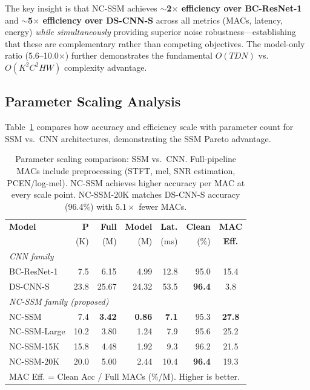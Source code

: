 \documentclass[journal]{IEEEtran}
\begin{document}
\smallskip
The key insight is that NC-SSM achieves \textbf{$\sim$2$\times$ efficiency over BC-ResNet-1} and \textbf{$\sim$5$\times$ efficiency over DS-CNN-S} across all metrics (MACs, latency, energy) \emph{while simultaneously} providing superior noise robustness---establishing that these are complementary rather than competing objectives.
The model-only ratio (5.6--10.0$\times$) further demonstrates the fundamental $O(TDN)$ vs.\ $O(K^2C^2HW)$ complexity advantage.

\subsection{Parameter Scaling Analysis}

Table~\ref{tab:scaling} compares how accuracy and efficiency scale with parameter count for SSM vs.\ CNN architectures, demonstrating the SSM Pareto advantage.

\begin{table}[t]
\centering
\caption{Parameter scaling comparison: SSM vs.\ CNN. Full-pipeline MACs include preprocessing (STFT, mel, SNR estimation, PCEN/log-mel). NC-SSM achieves higher accuracy per MAC at every scale point. NC-SSM-20K matches DS-CNN-S accuracy (96.4\%) with $5.1\times$ fewer MACs.}
\label{tab:scaling}
\small
\setlength{\tabcolsep}{2.8pt}
\begin{tabular}{lrrrrrc}
\toprule
\textbf{Model} & \textbf{P} & \textbf{Full} & \textbf{Model} & \textbf{Lat.} & \textbf{Clean} & \textbf{MAC}\\
               & (K)       & (M)          & (M)           & (ms)         & (\%)          & \textbf{Eff.} \\
\midrule
\multicolumn{7}{l}{\textit{CNN family}} \\
BC-ResNet-1    & 7.5  & 6.15 & 4.99 & 12.8 & 95.0 & 15.4 \\
DS-CNN-S       & 23.8 & 25.67 & 24.32 & 53.5 & \textbf{96.4} & 3.8 \\
\midrule
\multicolumn{7}{l}{\textit{NC-SSM family (proposed)}} \\
NC-SSM         & 7.4  & \textbf{3.42} & \textbf{0.86} & \textbf{7.1}  & 95.3 & \textbf{27.8} \\
NC-SSM-Large   & 10.2 & 3.80 & 1.24 & 7.9  & 95.6 & 25.2 \\
NC-SSM-15K     & 15.8 & 4.48 & 1.92 & 9.3  & 96.2 & 21.5 \\
NC-SSM-20K     & 20.0 & 5.00 & 2.44 & 10.4 & \textbf{96.4} & 19.3 \\
\bottomrule
\multicolumn{7}{l}{\small MAC Eff. = Clean Acc / Full MACs (\%/M). Higher is better.}
\end{tabular}
\end{table}
\end{document}

